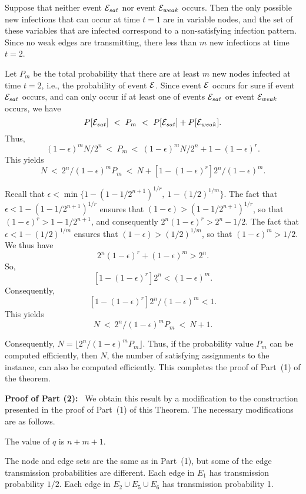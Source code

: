 Suppose that neither event ${\cal E}_{sat}$ nor event ${\cal E}_{weak}$ occurs.
Then the only possible new infections that can occur at time $t=1$ are in
variable nodes, and the set of these variables that are infected correspond 
to a non-satisfying infection pattern.
Since no weak edges are transmitting, there less than $m$ 
new infections at time $t=2$.

Let $P_m$ be the
total probability that there are at least $m$ new nodes infected at
time $t = 2$, i.e., the probability of event ${\cal E}$.  
Since event ${\cal E}$ occurs for sure if event ${\cal E}_{sat}$ occurs,
and can only occur if at least one of events ${\cal E}_{sat}$ or event ${\cal E}_{weak}$ occurs,
we have
$$P[{\cal E}_{sat}]  ~<~ P_m  ~<~  P[{\cal E}_{sat}]  + P[{\cal E}_{weak}].$$
Thus,
$$(1 -  \epsilon)^m N/2^n ~<~ P_m  ~<~  (1 -  \epsilon)^m N/2^n  
                                        + 1 - (1 -  \epsilon)^r.$$
This yields
$$ N  ~<~  2^n/(1 -  \epsilon)^m  P_m    ~<~   N  + 
                              [1 - (1 -  \epsilon)^r] 2^n/(1 -  \epsilon)^m.$$

Recall that 
 $\epsilon < \min\{1 - (1 - 1/{2^{n+1}})^{1/r},~1 - (1/2)^{1/m}\}$.
 The fact that $\epsilon < 1 - (1 - 1/{2^{n+1}})^{1/r}$ ensures that 
 $(1 -  \epsilon) > (1 - 1/{2^{n+1}})^{1/r}$, so that
 $(1 -  \epsilon)^r  > 1 - 1/{2^{n+1}}$,
 and consequently $2^n (1 -  \epsilon)^r  > 2^n-1/2$.
The fact that $\epsilon < 1 - (1/2)^{1/m}$ ensures that 
 $(1 -  \epsilon) > (1/2)^{1/m}$, so that
 $(1 -  \epsilon)^m  > 1/2$.
We thus have 
 $$2^n (1 -  \epsilon)^r + (1 -  \epsilon)^m  > 2^n.$$
So,
$$[ 1 - (1 -  \epsilon)^r] 2^n < (1 -  \epsilon)^m.$$
 Consequently,
 $$[1 - (1 -  \epsilon)^r] 2^n/(1 -  \epsilon)^m < 1.$$
This yields
$$ N ~<~ 2^n/(1 -  \epsilon)^m  P_m   ~<~  N  + 1.$$

Consequently, $N = \lfloor 2^n/(1 -  \epsilon)^m  P_m \rfloor.$
Thus, if the probability value $P_m$ can be computed efficiently,
then $N$, the number of satisfying assignments to the 
\mtsat{} instance, can also be computed efficiently.
This completes the proof of Part~(1) of the theorem.


\medskip
\noindent
\textbf{Proof of Part (2):}~ We obtain this result by a modification
to the construction presented in the proof of Part~(1) 
of  this Theorem.
The necessary modifications are as follows.

The value of $q$ is $n+m+1$.

The node and edge sets are the same as in Part~(1),
but some of the edge transmission probabilities are different.
Each edge in $E_1$ has transmission probability $1/2$.
Each edge in $E_2 \cup E_5 \cup E_6$ has transmission probability 1.

